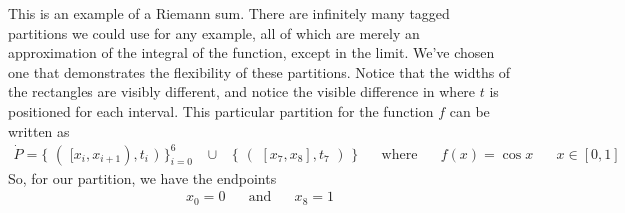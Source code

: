 \begin{example}
This is an example of a Riemann sum. There are infinitely many tagged partitions we could use for any example, all of which are merely an approximation of the integral of the function, except in the limit. We've chosen one that demonstrates the flexibility of these partitions. Notice that the widths of the rectangles are visibly different, and notice the visible difference in where $t$ is positioned for each interval. This particular partition for the function $f$ can be written as
\begin{align*}
    \dot P = \{ \hspace{4pt} ( \hspace{4pt} [x_{i}, x_{i+1}), t_{i} \hspace{4pt} ) \hspace{4pt} \}_{i = 0}^{6} \hspace{10pt} \cup \hspace{10pt} \{ \hspace{4pt} ( \hspace{4pt} [x_{7}, x_{8}], t_{7} \hspace{4pt} ) \hspace{4pt} \} \hspace{20pt} \text{where} \hspace{20pt} f(x) = \cos x \hspace{20pt} x \in [0, 1]  
\end{align*}
So, for our partition, we have the endpoints
\begin{align*}
    x_{0} = 0 \hspace{20pt} \text{and} \hspace{20pt} x_{8} = 1
\end{align*}
\end{example}
